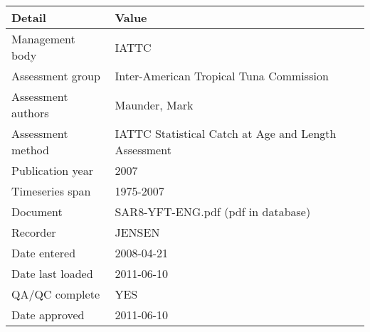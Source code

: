 \begin{table}[htb]
\centering
\begin{tabular}{lp{7cm}}
\toprule
Detail & Value \\
\midrule
Management body    & IATTC                                                \\
Assessment group   & Inter-American Tropical Tuna Commission              \\
Assessment authors & Maunder, Mark                                        \\
Assessment method  & IATTC Statistical Catch at Age and Length Assessment \\
Publication year   & 2007                                                 \\
Timeseries span    & 1975-2007                                            \\
Document           & SAR8-YFT-ENG.pdf (pdf in database)                   \\
Recorder           & JENSEN                                               \\
Date entered       & 2008-04-21                                           \\
Date last loaded   & 2011-06-10                                           \\
QA/QC complete     & YES                                                  \\
Date approved      & 2011-06-10                                           \\
\bottomrule
\end{tabular}
\label{tab:assessdet}
\end{table}
